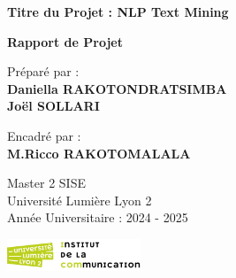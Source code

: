\begin{titlepage}
    \begin{center}
        \vspace*{1cm}
        
        \Huge
        \textbf{Titre du Projet : NLP Text Mining}

        \vspace{0.5cm}

        \vspace{1.5cm}

        \textbf{Rapport de Projet}

        \vfill

        \Large
        Préparé par : \\
         \textbf{Daniella RAKOTONDRATSIMBA} \\
          \textbf{Joël SOLLARI} \\
        \vspace{0.5cm}

        Encadré par : \\
        \textbf{M.Ricco RAKOTOMALALA}

        \vspace{1.5cm}

        Master 2 SISE \\
        Université Lumière Lyon 2 \\
        \vspace{0.2cm}
        Année Universitaire : 2024 - 2025

        \vspace{1cm}
        \includegraphics[width=0.3\textwidth]{Images/logo.png}
        
        \vspace{0.5cm}
    \end{center}
\end{titlepage}